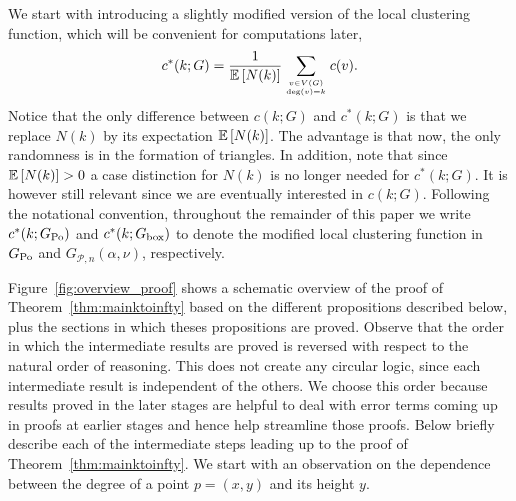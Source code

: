 We start with introducing a slightly modified version of the local clustering function, which will be convenient for computations later,
\begin{equation}\label{eq:def_local_clustering_ast_general}
	c^\ast(k;G) = \frac{1}{\mathbb{E}\left[N(k)\right]} \sum_{v \in V(G) \atop \text{deg}(v)=k} c(v).
\end{equation}
Notice that the only difference between $c(k;G)$ and $c^\ast(k;G)$ is that we replace $N(k)$ by its expectation $\mathbb{E}\left[N(k)\right]$. The advantage is that now, the only randomness is in the formation of triangles. In addition, note that since $\mathbb{E}\left[N(k)\right] > 0$ a case distinction for $N(k)$ is no longer needed for $c^\ast(k;G)$. It is however still relevant since we are eventually interested in $c(k;G)$. Following the notational convention, throughout the remainder of this paper we write $c^\ast(k; G_{{\mathrm{Po}}})$ and $c^\ast(k; G_{\mathrm{box}})$ to denote the modified local clustering function in $G_{{\mathrm{Po}}}$ and $G_{\mathcal{P},n}(\alpha,\nu)$, respectively.

Figure~\ref{fig:overview_proof} shows a schematic overview of the proof of Theorem~\ref{thm:mainktoinfty} based on the different propositions described below, plus the sections in which theses propositions are proved. Observe that the order in which the intermediate results are proved is reversed with respect to the natural order of reasoning. This does not create any circular logic, since each intermediate result is independent of the others. We choose this order because results proved in the later stages are helpful to deal with error terms coming up in proofs at earlier stages and hence help streamline those proofs. Below briefly describe each of the intermediate steps leading up to the proof of Theorem~\ref{thm:mainktoinfty}. We start with an observation on the dependence between the degree of a point $p = (x,y)$ and its height $y$.

